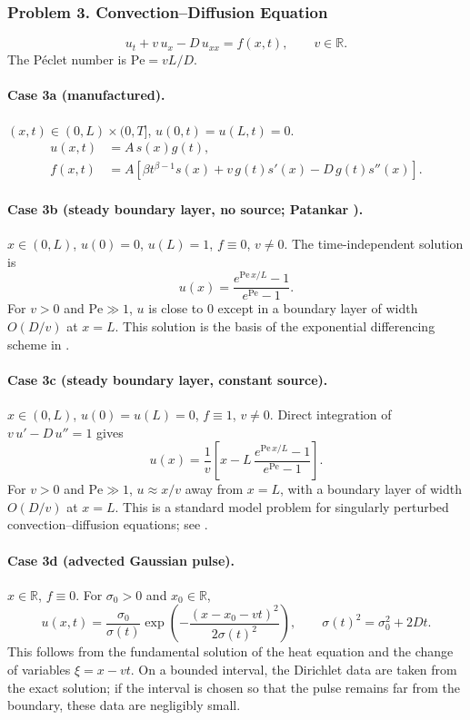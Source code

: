 \documentclass[11pt]{article}
\begin{document}
\subsubsection*{Problem 3. Convection--Diffusion Equation}

\[
\boxed{u_t+v\,u_x-D\,u_{xx}=f(x,t)},
\qquad v\in\mathbb{R}.
\]
The P\'eclet number is $\mathrm{Pe}=vL/D$.

\paragraph{Case 3a (manufactured).}
$(x,t)\in(0,L)\times(0,T]$, $u(0,t)=u(L,t)=0$.
\[
\begin{aligned}
u(x,t)&=A\,s(x)g(t),\\
f(x,t)&=A\left[
\beta t^{\beta-1}s(x)
+v\,g(t)s'(x)-D\,g(t)s''(x)
\right].
\end{aligned}
\]

\paragraph{Case 3b (steady boundary layer, no source; Patankar \cite[Ch.~5]{Pat80}).}
$x\in(0,L)$, $u(0)=0$, $u(L)=1$, $f\equiv0$, $v\neq0$. The
time-independent solution is
\[
u(x)=\frac{e^{\mathrm{Pe}\,x/L}-1}{e^{\mathrm{Pe}}-1}.
\]
For $v>0$ and $\mathrm{Pe}\gg1$, $u$ is close to $0$ except in a boundary layer of
width $O(D/v)$ at $x=L$. This solution is the basis of the exponential
differencing scheme in \cite{Pat80}.

\paragraph{Case 3c (steady boundary layer, constant source).}
$x\in(0,L)$, $u(0)=u(L)=0$, $f\equiv1$, $v\neq0$. Direct integration of
$v\,u'-D\,u''=1$ gives
\[
u(x)=\frac{1}{v}\left[x-L\,\frac{e^{\mathrm{Pe}\,x/L}-1}{e^{\mathrm{Pe}}-1}\right].
\]
For $v>0$ and $\mathrm{Pe}\gg1$, $u\approx x/v$ away from $x=L$, with a
boundary layer of width $O(D/v)$ at $x=L$. This is a standard model
problem for singularly perturbed convection--diffusion equations; see
\cite{RST08}.

\paragraph{Case 3d (advected Gaussian pulse).}
$x\in\mathbb{R}$, $f\equiv0$. For $\sigma_0>0$ and $x_0\in\mathbb{R}$,
\[
u(x,t)=\frac{\sigma_0}{\sigma(t)}
\exp\!\left(-\frac{(x-x_0-vt)^2}{2\sigma(t)^2}\right),
\qquad
\sigma(t)^2=\sigma_0^2+2Dt.
\]
This follows from the fundamental solution of the heat equation
\cite[Sec.~2.3]{Eva10} and the change of variables $\xi=x-vt$. On a
bounded interval, the Dirichlet data are taken from the exact solution;
if the interval is chosen so that the pulse remains far from the
boundary, these data are negligibly small.
\end{document}
